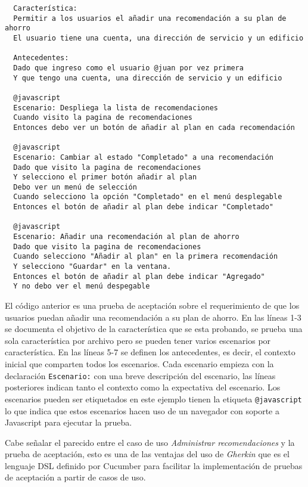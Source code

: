 \begin{lstlisting}
  Característica:
  Permitir a los usuarios el añadir una recomendación a su plan de ahorro
  El usuario tiene una cuenta, una dirección de servicio y un edificio

  Antecedentes:
  Dado que ingreso como el usuario @juan por vez primera
  Y que tengo una cuenta, una dirección de servicio y un edificio

  @javascript
  Escenario: Despliega la lista de recomendaciones
  Cuando visito la pagina de recomendaciones
  Entonces debo ver un botón de añadir al plan en cada recomendación

  @javascript
  Escenario: Cambiar al estado "Completado" a una recomendación
  Dado que visito la pagina de recomendaciones
  Y selecciono el primer botón añadir al plan
  Debo ver un menú de selección
  Cuando selecciono la opción "Completado" en el menú desplegable
  Entonces el botón de añadir al plan debe indicar "Completado"

  @javascript
  Escenario: Añadir una recomendación al plan de ahorro
  Dado que visito la pagina de recomendaciones
  Cuando selecciono "Añadir al plan" en la primera recomendación
  Y selecciono "Guardar" en la ventana.
  Entonces el botón de añadir al plan debe indicar "Agregado"
  Y no debo ver el menú despegable
\end{lstlisting}

El código anterior es una prueba de aceptación sobre el requerimiento de que los
usuarios puedan añadir una recomendación a su plan de ahorro.
En las líneas 1-3 se documenta el objetivo de la característica que se esta
probando, se prueba una sola característica por archivo pero se pueden tener
varios escenarios por característica. En las líneas 5-7 se definen
los antecedentes, es decir, el contexto inicial que comparten todos los
escenarios. Cada escenario empieza con la declaración \texttt{Escenario:}
con una breve descripción del escenario, las líneas posteriores indican
tanto el contexto como la expectativa del escenario. Los escenarios
pueden ser etiquetados en este ejemplo tienen la etiqueta \texttt{@javascript}
lo que indica que estos escenarios hacen uso de un navegador con soporte
a Javascript para ejecutar la prueba.

Cabe señalar el parecido entre el caso de uso \textit{Administrar recomendaciones}
y la prueba de aceptación, esto es una de las ventajas del uso de \textit{Gherkin}
que es el lenguaje DSL definido por Cucumber para facilitar la implementación
de pruebas de aceptación a partir de casos de uso.

